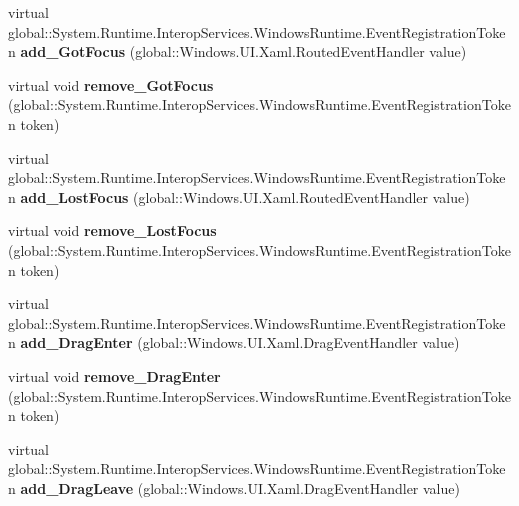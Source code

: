 \begin{DoxyCompactItemize}
virtual global\+::\+System.\+Runtime.\+Interop\+Services.\+Windows\+Runtime.\+Event\+Registration\+Token {\bfseries add\+\_\+\+Got\+Focus} (global\+::\+Windows.\+U\+I.\+Xaml.\+Routed\+Event\+Handler value)
\item 
\mbox{\label{class_windows_1_1_u_i_1_1_xaml_1_1_u_i_element_a969ce3d1998e0289e2292ad1e208096f}} 
virtual void {\bfseries remove\+\_\+\+Got\+Focus} (global\+::\+System.\+Runtime.\+Interop\+Services.\+Windows\+Runtime.\+Event\+Registration\+Token token)
\item 
\mbox{\label{class_windows_1_1_u_i_1_1_xaml_1_1_u_i_element_ac2967b5f0d4bd33c16e3b3b32e19b01a}} 
virtual global\+::\+System.\+Runtime.\+Interop\+Services.\+Windows\+Runtime.\+Event\+Registration\+Token {\bfseries add\+\_\+\+Lost\+Focus} (global\+::\+Windows.\+U\+I.\+Xaml.\+Routed\+Event\+Handler value)
\item 
\mbox{\label{class_windows_1_1_u_i_1_1_xaml_1_1_u_i_element_aea3d40de4ee0bc713def8655f7f7ccd3}} 
virtual void {\bfseries remove\+\_\+\+Lost\+Focus} (global\+::\+System.\+Runtime.\+Interop\+Services.\+Windows\+Runtime.\+Event\+Registration\+Token token)
\item 
\mbox{\label{class_windows_1_1_u_i_1_1_xaml_1_1_u_i_element_a84e265c30f9ba7acab529bdfc0475eb7}} 
virtual global\+::\+System.\+Runtime.\+Interop\+Services.\+Windows\+Runtime.\+Event\+Registration\+Token {\bfseries add\+\_\+\+Drag\+Enter} (global\+::\+Windows.\+U\+I.\+Xaml.\+Drag\+Event\+Handler value)
\item 
\mbox{\label{class_windows_1_1_u_i_1_1_xaml_1_1_u_i_element_ab1b0c333cb61061297f04ff3341ed26d}} 
virtual void {\bfseries remove\+\_\+\+Drag\+Enter} (global\+::\+System.\+Runtime.\+Interop\+Services.\+Windows\+Runtime.\+Event\+Registration\+Token token)
\item 
\mbox{\label{class_windows_1_1_u_i_1_1_xaml_1_1_u_i_element_a09d1a9af723d25f04884ff5c295f0e44}} 
virtual global\+::\+System.\+Runtime.\+Interop\+Services.\+Windows\+Runtime.\+Event\+Registration\+Token {\bfseries add\+\_\+\+Drag\+Leave} (global\+::\+Windows.\+U\+I.\+Xaml.\+Drag\+Event\+Handler value)

\end{DoxyCompactItemize}
